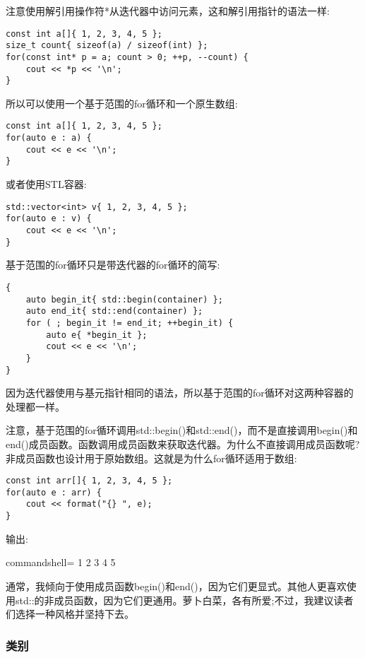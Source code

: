 注意使用解引用操作符*从迭代器中访问元素，这和解引用指针的语法一样:

\begin{lstlisting}[style=styleCXX]
const int a[]{ 1, 2, 3, 4, 5 };
size_t count{ sizeof(a) / sizeof(int) };
for(const int* p = a; count > 0; ++p, --count) {
	cout << *p << '\n';
}
\end{lstlisting}

所以可以使用一个基于范围的for循环和一个原生数组:

\begin{lstlisting}[style=styleCXX]
const int a[]{ 1, 2, 3, 4, 5 };
for(auto e : a) {
	cout << e << '\n';
}
\end{lstlisting}

或者使用STL容器:

\begin{lstlisting}[style=styleCXX]
std::vector<int> v{ 1, 2, 3, 4, 5 };
for(auto e : v) {
	cout << e << '\n';
}
\end{lstlisting}

基于范围的for循环只是带迭代器的for循环的简写:

\begin{lstlisting}[style=styleCXX]
{
	auto begin_it{ std::begin(container) };
	auto end_it{ std::end(container) };
	for ( ; begin_it != end_it; ++begin_it) {
		auto e{ *begin_it };
		cout << e << '\n';
	}
}
\end{lstlisting}

因为迭代器使用与基元指针相同的语法，所以基于范围的for循环对这两种容器的处理都一样。

注意，基于范围的for循环调用std::begin()和std::end()，而不是直接调用begin()和end()成员函数。函数调用成员函数来获取迭代器。为什么不直接调用成员函数呢?非成员函数也设计用于原始数组。这就是为什么for循环适用于数组:

\begin{lstlisting}[style=styleCXX]
const int arr[]{ 1, 2, 3, 4, 5 };
for(auto e : arr) {
	cout << format("{} ", e);
}
\end{lstlisting}

输出:

\begin{tcblisting}{commandshell={}}
1 2 3 4 5
\end{tcblisting}

通常，我倾向于使用成员函数begin()和end()，因为它们更显式。其他人更喜欢使用std::的非成员函数，因为它们更通用。萝卜白菜，各有所爱;不过，我建议读者们选择一种风格并坚持下去。

\subsubsection{类别}

